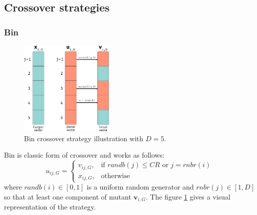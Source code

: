 \subsection{Crossover strategies}

\subsubsection{Bin}
\begin{figure}[h]
	\centering
	\includegraphics[width=0.4\textwidth]{figures/de-rand.png}
	\caption{Bin crossover strategy illustration with $D = 5$.}
	\label{fig:bin-crossover}
\end{figure}

Bin is classic form of crossover and works as follows:
\begin{equation}
	u_{ij, G} = \begin{cases}
		v_{ij, G}, &\textrm{if }\textit{randb}(j) \leq \textit{CR}\textrm{ or } j = \textit{rnbr}(i)\\
		x_{ij, G}, &\textrm{otherwise}
	\end{cases}
\end{equation}
where $\textit{randb}(i) \in [0, 1]$ is a uniform random generator and $\textit{rnbr}(j) \in [1, D]$ so that at least one component of mutant $\textbf{v}_{i, G}$. The figure \ref{fig:bin-crossover} gives a visual representation of the strategy.


